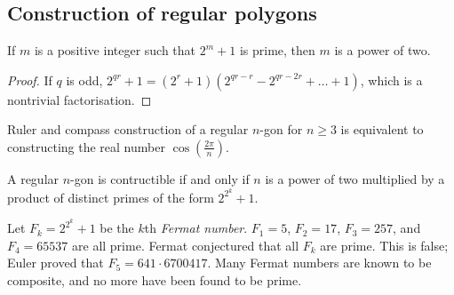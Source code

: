 \subsection{Construction of regular polygons}
\begin{lemma}
	If \( m \) is a positive integer such that \( 2^m + 1 \) is prime, then \( m \) is a power of two.
\end{lemma}
\begin{proof}
	If \( q \) is odd, \( 2^{qr} + 1 = (2^r + 1)(2^{qr - r} - 2^{qr - 2r} + \dots + 1) \), which is a nontrivial factorisation.
\end{proof}
Ruler and compass construction of a regular \( n \)-gon for \( n \geq 3 \) is equivalent to constructing the real number \( \cos(\frac{2\pi}{n}) \).
\begin{theorem}[Gauss]
	A regular \( n \)-gon is contructible if and only if \( n \) is a power of two multiplied by a product of distinct primes of the form \( 2^{2^k} + 1 \).
\end{theorem}
\begin{remark}
	Let \( F_k = 2^{2^k} + 1 \) be the \( k \)th \emph{Fermat number}.
	\( F_1 = 5 \), \( F_2 = 17 \), \( F_3 = 257 \), and \( F_4 = 65537 \) are all prime.
	Fermat conjectured that all \( F_k \) are prime.
	This is false; Euler proved that \( F_5 = 641 \cdot 6700417 \).
	Many Fermat numbers are known to be composite, and no more have been found to be prime.
\end{remark}

